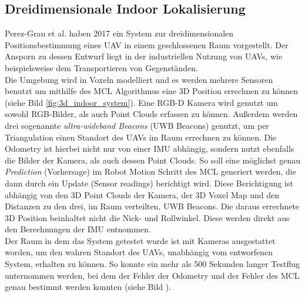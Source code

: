 \subsection{Dreidimensionale Indoor Lokalisierung}\label{subsec:3d_indoor}
Perez-Grau et al. \cite{dreidimensionale_indoor_lokalisierung} haben 2017 ein System zur dreidimensionalen Positionsbestimmung eines UAV in einem geschlossenen Raum vorgestellt. Der Ansporn zu dessen Entwurf liegt in der industriellen Nutzung von UAVs, wie beispielsweise dem Transportieren von Gegenständen.\\
Die Umgebung wird in Voxeln modelliert und es werden mehrere Sensoren benutzt um mithilfe des MCL Algorithmus eine 3D Position errechnen zu können (siehe Bild \ref{fig:3d_indoor_system}). Eine RGB-D Kamera wird genutzt um sowohl RGB-Bilder, als auch Point Clouds erfassen zu können. Außerdem werden drei sogenannte \textit{ultra-wideband Beacons} (UWB Beacons) genutzt, um per Triangulation einen Standort des UAVs im Raum errechnen zu können. Die Odometry ist hierbei nicht nur von einer IMU abhängig, sondern nutzt ebenfalls die Bilder der Kamera, als auch dessen Point Clouds. So soll eine möglichst genau \textit{Prediction} (Vorhersage) im Robot Motion Schritt des MCL generiert werden, die dann durch ein Update (Sensor readings) berichtigt wird. Diese Berichtigung ist abhängig von den 3D Point Clouds der Kamera, der 3D Voxel Map und den Distanzen zu den drei, im Raum verteilten, UWB Beacons. Die daraus errechnete 3D Position beinhaltet nicht die Nick- und Rollwinkel. Diese werden direkt aus den Berechnungen der IMU entnommen.\\
Der Raum in dem das System getestet wurde ist mit Kameras ausgestattet worden, um den wahren Standort des UAVs, unabhängig vom entworfenen System, erhalten zu können. So konnte ein mehr als 500 Sekunden langer Testflug unternommen werden, bei dem der Fehler der Odometry und der Fehler des MCL genau bestimmt werden konnten (siehe Bild ).
